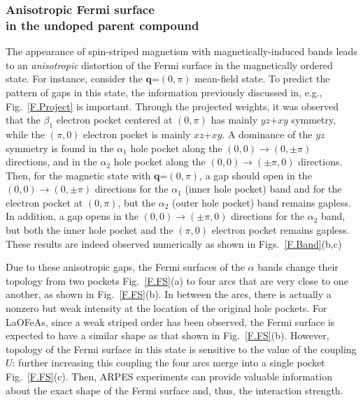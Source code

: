 \documentclass[aps,prb,superscriptaddress,preprintnumbers,
showpacs,legalpaper,twoside,twocolumn,amsmath,amssymb]{revtex4}
\begin{document}
\subsubsection{Anisotropic Fermi surface \\
in the undoped parent compound}

The appearance of spin-striped magnetism with magnetically-induced bands
leads to an {\it anisotropic}
distortion of the Fermi surface in the magnetically ordered state. For instance,
consider the $\mathbf{q}$=$(0,\pi)$ mean-field state. To predict the
pattern of gaps in this state, the information previously discussed in, e.g.,
Fig.~\ref{F.Project}
is important. Through the projected weights, it was observed that the $\beta_1$ electron
pocket centered at $(0,\pi)$ has mainly $yz$+$xy$ symmetry,
while the $(\pi,0)$ electron pocket is mainly $xz$+$xy$.
A dominance of the  $yz$ symmetry is found in the $\alpha_1$ hole pocket along
the $(0,0)\rightarrow(0,\pm \pi)$ directions, and in the $\alpha_2$ hole pocket
along the $(0,0)\rightarrow(\pm \pi,0)$ directions.
%
Then, for the magnetic state with $\mathbf{q}$=$(0,\pi)$,  a gap should open in
the $(0,0)\rightarrow(0,\pm \pi)$ directions for the $\alpha_1$ (inner hole pocket) band and
for the electron pocket at $(0,\pi)$, but the $\alpha_2$ (outer hole pocket) band remains gapless.
In addition, a gap opens in the $(0,0)\rightarrow(\pm \pi,0)$ directions for the
$\alpha_2$ band, but both the inner hole pocket and the $(\pi,0)$
electron pocket remains gapless.
These results  are indeed observed numerically as shown in Figs.~\ref{F.Band}(b,c)

Due to these anisotropic gaps, the Fermi surfaces of the $\alpha$ bands
change their topology from two pockets Fig.~\ref{F.FS}(a) to  four arcs that
are very close to one another, as
shown in Fig.~\ref{F.FS}(b). In between the arcs, there is actually a nonzero but
weak intensity at the location of the original hole pockets.
For LaOFeAs, since a weak striped order
has been observed, the Fermi surface is expected to have a similar shape
as that shown in Fig.~\ref{F.FS}(b). However, topology of the Fermi
surface in this state is sensitive to the value of the coupling $U$:
further increasing this coupling
the four arcs merge into a single pocket Fig.~\ref{F.FS}(c).
Then,
ARPES experiments can provide valuable information about the exact
shape of the Fermi surface and, thus, the interaction strength.
\end{document}
